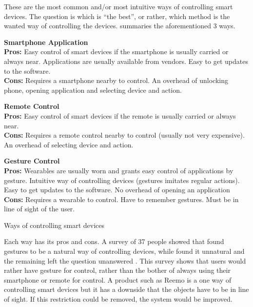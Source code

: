 These are the most common and/or most intuitive ways of controlling smart devices. 
The question is which is ``the best'', or rather, which method is the wanted way of controlling the devices.
 summaries the aforementioned 3 ways. 

\begin{table}[!htb]
    \centering
    \parbox[t][][t]{0.3\textwidth}{
        \textbf{Smartphone Application}\\
        \textbf{Pros:} Easy control of smart devices if the smartphone is usually carried or always near. 
                       Applications are usually available from vendors. 
                       Easy to get updates to the software. \\
        \textbf{Cons:} Requires a smartphone nearby to control. 
                       An overhead of unlocking phone, opening application and selecting device and action.
    }\quad
    \parbox[t][][t]{0.3\textwidth}{
        \textbf{Remote Control}\\
        \textbf{Pros:} Easy control of smart devices if the remote is usually carried or always near. \\
        \textbf{Cons:} Requires a remote control nearby to control (usually not very expensive). 
                       An overhead of selecting device and action.
    }\quad
    \parbox[t][][t]{0.3\textwidth}{
        \textbf{Gesture Control}\\
        \textbf{Pros:} Wearables are usually worn and grants easy control of applications by gesture.
                       Intuitive way of controlling devices (gestures imitates regular actions).
                       Easy to get updates to the software. 
                       No overhead of opening an application\\
        \textbf{Cons:} Requires a wearable to control. 
                       Have to remember gestures.
                       Must be in line of sight of the user.
    }
    \caption{Ways of controlling smart devices}
    \label{tbl:smartcontrol}
\end{table}

Each way has its pros and cons. 
A survey of 37 people showed that  found gestures to be a natural way of controlling devices, 
while  found it unnatural and the remaining left the question unanswered \cite{Kela2006}. 
This survey shows that users would rather have gesture for control, 
rather than the bother of always using their smartphone or remote for control.  
A product such as Reemo is a one way of controlling smart devices but it has a downside that the objects have to be in line of sight. 
If this restriction could be removed, the system would be improved.

